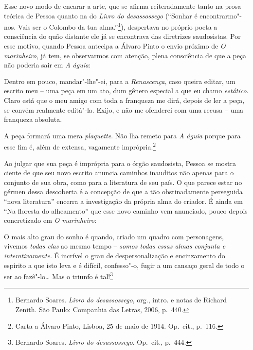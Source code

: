 Esse novo modo de encarar a arte,
que se afirma reiteradamente tanto na
prosa teórica de Pessoa quanto na do
\textit{Livro do desassossego}
(“Sonhar é encontrarmo"-nos. Vais ser o Colombo da
tua alma.”\footnote{ Bernardo Soares. 
\textit{Livro do desassossego}, org., intro. e notas
de Richard Zenith. São Paulo:
Companhia das Letras, 2006, p.~440.}),
despertava no próprio poeta a consciência
do quão distante ele já se
encontrava das diretrizes saudosistas.
Por esse motivo, quando Pessoa
antecipa a Álvaro Pinto o envio próximo de
\textit{O marinheiro}, já
tem, se observarmos com atenção, plena
consciência de que a peça não
poderia sair em \textit{A águia}: 

\begin{hedraquote}
Dentro em pouco, mandar"-lhe"-ei, para a \textit{Renascença}, caso queira
editar, um escrito meu -- uma peça em um ato, dum gênero especial a que
eu chamo \textit{estático}. Claro está que o meu amigo com toda a
franqueza me dirá, depois de ler a peça, se convém realmente editá"-la.
Exijo, e não me ofenderei com uma recusa -- uma franqueza absoluta.

A peça formará uma mera \textit{plaquette}. Não lha remeto para
\textit{A águia} porque para esse fim é, além de extensa, vagamente
imprópria.\footnote{ Carta a Álvaro Pinto,
Lisboa, 25 de maio de 1914.
Op.~cit., p.~116.}
\end{hedraquote}

Ao julgar que sua peça é imprópria para o órgão saudosista, Pessoa se
mostra ciente de que seu novo escrito anuncia caminhos inauditos não
apenas para o conjunto de sua obra, como para a literatura de seu país.
O que parece estar no gérmen dessa descoberta é a concepção de que a
tão obstinadamente perseguida “nova literatura” encerra a investigação
da própria alma do criador. É ainda em “Na floresta do alheamento” que
esse novo caminho vem anunciado, pouco depois
concretizado em \textit{O marinheiro}:

\begin{hedraquote}
O mais alto grau do sonho é quando, criado um quadro com personagens,
vivemos \textit{todas elas} ao mesmo tempo -- \textit{somos todas essas
almas conjunta e interativamente}. É incrível o grau de
despersonalização e encinzamento do espírito a que isto leva e é
difícil, confesso"-o, fugir a um cansaço geral de todo o ser ao
fazê"-lo\ldots{} Mas o triunfo é tal!\footnote{ Bernardo Soares. 
\textit{Livro do desassossego}. Op.~cit., p.~444.} 
\end{hedraquote}


